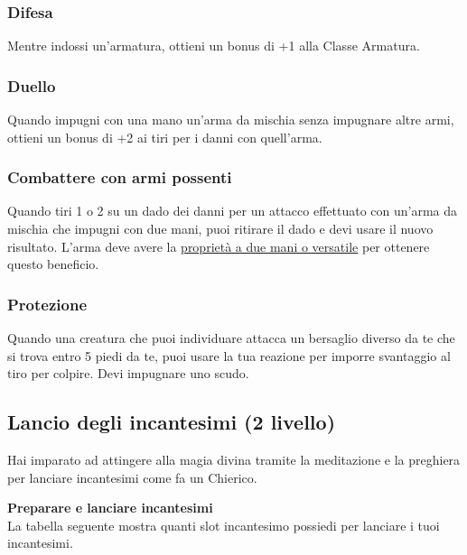 \documentclass[a4paper,10pt,twoside,twocolumn,openany,bg=full,nodeprecatedcode]{dndbook}
\begin{document}
\subsubsection{Difesa}\label{difesa}
Mentre indossi un'armatura, ottieni un bonus di +1 alla Classe Armatura.

\subsubsection{Duello}\label{duello}
Quando impugni con una mano un'arma da mischia senza impugnare altre armi, ottieni un bonus di +2 ai tiri per i danni con quell'arma.

\subsubsection{Combattere con armi possenti}\label{combattere_con_armi_possenti}
Quando tiri 1 o 2 su un dado dei danni per un attacco effettuato con un'arma da mischia che impugni con due mani, puoi ritirare il dado e devi usare il nuovo risultato. L'arma deve avere la \hyperref[Weapon_Properties_weapon_properties]{proprietà a due mani o versatile} per ottenere questo beneficio.

\subsubsection{Protezione}\label{protezione}
Quando una creatura che puoi individuare attacca un bersaglio diverso da te che si trova entro 5 piedi da te, puoi usare la tua reazione per imporre svantaggio al tiro per colpire. Devi impugnare uno scudo.

\subsection{Lancio degli incantesimi (2\degree{} livello)}\label{Vanguard_spellcasting}
Hai imparato ad attingere alla magia divina tramite la meditazione e la preghiera per lanciare incantesimi come fa un Chierico.

\textbf{Preparare e lanciare incantesimi} \\ La tabella seguente mostra quanti slot incantesimo possiedi per lanciare i tuoi incantesimi.
\end{document}

